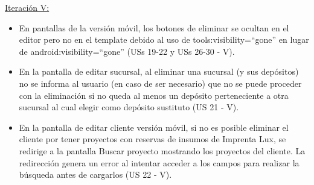 \documentclass[a4paper, 12pt,twoside]{report}  %
\numberwithin{equation}{subsection} %
\begin{document}
\underline{Iteración V:}
\begin{itemize}
	\item En pantallas de la versión móvil, los botones de eliminar se ocultan en el editor pero no en el template debido al uso de tools:visibility=``gone'' en lugar de android:visibility=``gone'' (USs 19-22 y USs 26-30 - V).
	\item En la pantalla de editar sucursal, al eliminar una sucursal (y sus depósitos) no se informa al usuario (en caso de ser necesario) que no se puede proceder con la eliminación si no queda al menos un depósito perteneciente a otra sucursal al cual elegir como depósito sustituto (US 21 - V).
	\item En la pantalla de editar cliente versión móvil, si no es posible eliminar el cliente por tener proyectos con reservas de insumos de Imprenta Lux, se redirige a la pantalla Buscar proyecto mostrando los proyectos del cliente. La redirección genera un error al intentar acceder a los campos para realizar la búsqueda antes de cargarlos (US 22 - V).
\end{itemize}
\end{document}
